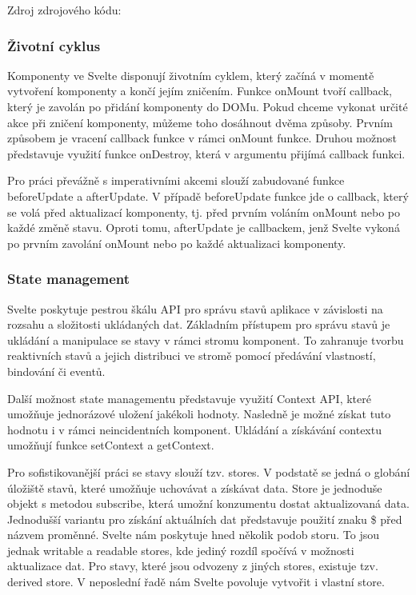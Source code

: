 Zdroj zdrojového kódu: \cite{svelte}

\subsubsection{Životní cyklus}

Komponenty ve Svelte disponují životním cyklem, který začíná v momentě vytvoření komponenty a končí jejím zničením. 
Funkce onMount tvoří callback, který je zavolán po přidání komponenty do DOMu. Pokud chceme vykonat určité akce při zničení komponenty, můžeme toho dosáhnout dvěma způsoby. 
Prvním způsobem je vracení callback funkce v rámci onMount funkce. Druhou možnost představuje využití funkce onDestroy, která v argumentu přijímá callback funkci. 

Pro práci převážně s imperativními akcemi slouží zabudované funkce beforeUpdate a afterUpdate. 
V případě beforeUpdate funkce jde o callback, který se volá před aktualizací komponenty, tj. před prvním voláním onMount nebo po každé změně stavu. 
Oproti tomu, afterUpdate je callbackem, jenž Svelte vykoná po prvním zavolání onMount nebo po každé aktualizaci komponenty.\cite{sveltehandbook,svelte}

\subsubsection{State management}

Svelte poskytuje pestrou škálu API pro správu stavů aplikace v závislosti na rozsahu a složitosti ukládaných dat. 
Základním přístupem pro správu stavů je ukládání a manipulace se stavy v rámci stromu komponent. 
To zahranuje tvorbu reaktivních stavů a jejich distribuci ve stromě pomocí předávání vlastností, bindování či eventů. 

Další možnost state managementu představuje využití Context API, které umožňuje jednorázové uložení jakékoli hodnoty. 
Nasledně je možné získat tuto hodnotu i v rámci neincidentních komponent. Ukládání a získávání contextu umožňují funkce setContext a getContext.

Pro sofistikovanější práci se stavy slouží tzv. stores. V podstatě se jedná o globání úložiště stavů, které umožňuje uchovávat a získávat data. 
Store je jednoduše objekt s metodou subscribe, která umožní konzumentu dostat aktualizovaná data. 
Jednodušší variantu pro získání aktuálních dat představuje použití znaku \$ před názvem proměnné. Svelte nám poskytuje hned několik podob storu. 
To jsou jednak writable a readable stores, kde jediný rozdíl spočívá v možnosti aktualizace dat. 
Pro stavy, které jsou odvozeny z jiných stores, existuje tzv. derived store. V neposlední řadě nám Svelte povoluje vytvořit i vlastní store. 

